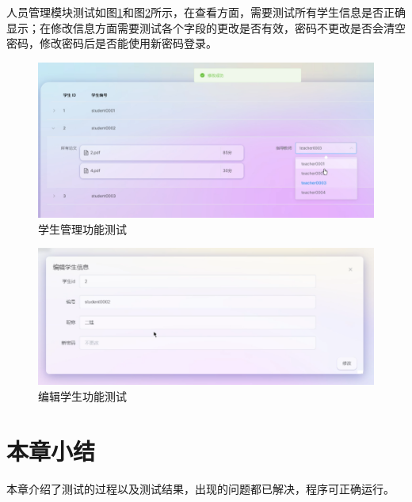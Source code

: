 人员管理模块测试如图\ref{manage-students}和图\ref{manage-edit-student-test}所示，在查看方面，需要测试所有学生信息是否正确显示；在修改信息方面需要测试各个字段的更改是否有效，密码不更改是否会清空密码，修改密码后是否能使用新密码登录。

\begin{figure}
  \centering
  \includegraphics[scale = 0.6]{out/figure/测试/manage-students.png}
  \caption{\song\wuhao 学生管理功能测试}
  \label{manage-students}
\end{figure}

\begin{figure}[htbp]
  \centering
  \includegraphics[scale = 0.6]{out/figure/测试/manage-edit-student-test.png}
  \caption{\song\wuhao 编辑学生功能测试}
  \label{manage-edit-student-test}
\end{figure}

\section{本章小结}

本章介绍了测试的过程以及测试结果，出现的问题都已解决，程序可正确运行。